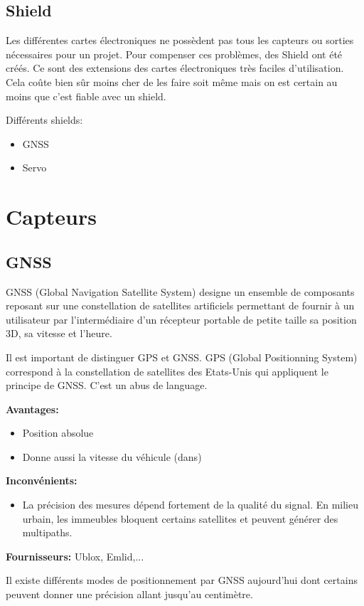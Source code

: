 \documentclass[a4paper, 11pt]{report}
\begin{document}
\section{Shield}
Les différentes cartes électroniques ne possèdent pas tous les capteurs ou sorties nécessaires pour un projet. Pour compenser ces problèmes, des Shield ont été créés. Ce sont des extensions des cartes électroniques très faciles d'utilisation. Cela coûte bien sûr moins cher de les faire soit même mais on est certain au moins que c'est fiable avec un shield.

Différents shields:
\begin{itemize}
\item GNSS
\item Servo
\end{itemize}

\chapter{Capteurs}

\section{GNSS}
GNSS (Global Navigation Satellite System)  designe un ensemble de composants reposant sur une constellation de satellites artificiels permettant de fournir à un utilisateur par l’intermédiaire d'un récepteur portable de petite taille sa position 3D, sa vitesse et l'heure.

Il est important de distinguer GPS et GNSS. GPS (Global Positionning System) correspond à la constellation de satellites des Etats-Unis qui appliquent le principe de GNSS. C'est un abus de language.

\textbf{Avantages:}
\begin{itemize}
\item Position absolue
\item Donne aussi la vitesse du véhicule (dans)
\end{itemize}

\textbf{Inconvénients:}
\begin{itemize}
\item La précision des mesures dépend fortement de la qualité du signal. En milieu urbain, les immeubles bloquent certains satellites et peuvent générer des multipaths.
\end{itemize}

\textbf{Fournisseurs:} Ublox, Emlid,...

Il existe différents modes de positionnement par GNSS aujourd'hui dont certains peuvent donner une  précision allant jusqu'au centimètre.
\end{document}
